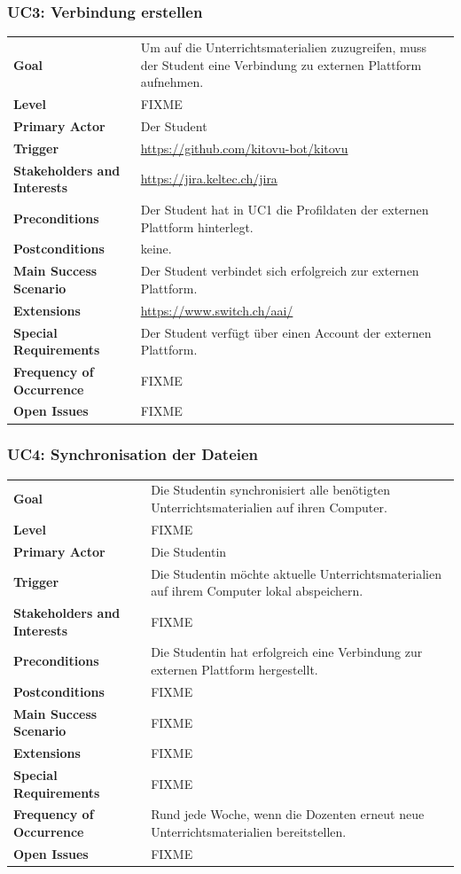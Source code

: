 \documentclass[a4paper]{article}
\def\jiraurl{https://jira.keltec.ch/jira}
\begin{document}
\subsubsection{UC3: Verbindung erstellen}
\begin{tabulary}{\linewidth}{lp{30em}}
	\textbf{Goal} & Um auf die Unterrichtsmaterialien zuzugreifen, muss der Student eine Verbindung zu externen Plattform aufnehmen. \\
	\textbf{Level} & FIXME \\
	\textbf{Primary Actor} & Der Student \\
	\textbf{Trigger} & \url{https://github.com/kitovu-bot/kitovu} \\
	\textbf{Stakeholders and Interests} & \url{\jiraurl} \\
	\textbf{Preconditions} & Der Student hat in UC1 die Profildaten der externen Plattform hinterlegt.\\
	\textbf{Postconditions} & keine.\\
	\textbf{Main Success Scenario} & Der Student verbindet sich erfolgreich zur externen Plattform. \\
	\textbf{Extensions} & \url{https://www.switch.ch/aai/} \\
	\textbf{Special Requirements} & Der Student verfügt über einen Account der externen Plattform. \\
	\textbf{Frequency of Occurrence} & FIXME \\
	\textbf{Open Issues} & FIXME \\
\end{tabulary}


\subsubsection{UC4: Synchronisation der Dateien}

\begin{tabulary}{\linewidth}{lp{30em}}
	\textbf{Goal} & Die Studentin synchronisiert alle benötigten Unterrichtsmaterialien auf ihren Computer. \\
	\textbf{Level} & FIXME \\
	\textbf{Primary Actor} & Die Studentin \\
	\textbf{Trigger} & Die Studentin möchte aktuelle Unterrichtsmaterialien auf ihrem Computer lokal abspeichern. \\
	\textbf{Stakeholders and Interests} & FIXME \\
	\textbf{Preconditions} & Die Studentin hat erfolgreich eine Verbindung zur externen Plattform hergestellt. \\
	\textbf{Postconditions} & FIXME \\
	\textbf{Main Success Scenario} & FIXME \\
	\textbf{Extensions} & FIXME \\
	\textbf{Special Requirements} & FIXME \\
	\textbf{Frequency of Occurrence} & Rund jede Woche, wenn die Dozenten erneut neue Unterrichtsmaterialien bereitstellen.  \\
	\textbf{Open Issues} & FIXME \\
\end{tabulary}
\end{document}
